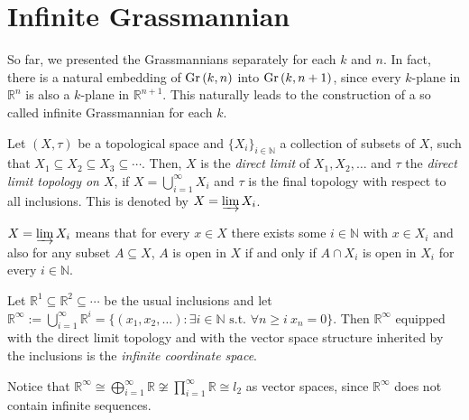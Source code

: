 \section{Infinite Grassmannian}
So far, we presented the Grassmannians separately for each $k$ and $n$. In fact, there is a natural embedding of $\Gr{k}{n}$ into $\Gr{k}{n+1}$, since every $k$-plane in $\mathbb{R}^n$ is also a $k$-plane in $\mathbb{R}^{n+1}$. This naturally leads to the construction of a so called infinite Grassmannian for each $k$.

\begin{definition} Let $(X,\tau)$ be a topological space and $\{X_i\}_{i\in\mathbb{N}}$ a collection of subsets of $X$, such that $X_1\subseteq X_2\subseteq X_3\subseteq\cdots$. Then, $X$ is the \emph{direct limit} of $X_1,X_2,\ldots$ and $\tau$ the \emph{direct limit topology on $X$}, if $X=\bigcup_{i=1}^{\infty}X_i$ and $\tau$ is the final topology with respect to all inclusions. This is denoted by $X=\varinjlim X_i$.
\end{definition}
\begin{remark} $X=\varinjlim X_i$ means that for every $x\in X$ there exists some $i\in\mathbb{N}$ with $x\in X_i$ and also for any subset $A\subseteq X$, $A$ is open in $X$ if and only if $A\cap X_i$ is open in $X_i$ for every $i\in\mathbb{N}$.
\end{remark}

\begin{definition} Let $\mathbb{R}^1\subseteq\mathbb{R}^2\subseteq\cdots$ be the usual inclusions and let $\mathbb{R}^{\infty}:=\bigcup_{i=1}^{\infty}\mathbb{R}^i=\big\{(x_1,x_2,\ldots):\exists i\in\mathbb{N}\text{ s.t. }\forall n\geq i\ x_n=0\big\}$. Then $\mathbb{R}^{\infty}$ equipped with the direct limit topology and with the vector space structure inherited by the inclusions is the \emph{infinite coordinate space}.
\end{definition}
\begin{remark} Notice that $\mathbb{R}^{\infty}\cong\bigoplus_{i=1}^{\infty}\mathbb{R}\not\cong\prod_{i=1}^{\infty}\mathbb{R}\cong l_2$ as vector spaces, since $\mathbb{R}^{\infty}$ does not contain infinite sequences.
\end{remark}


